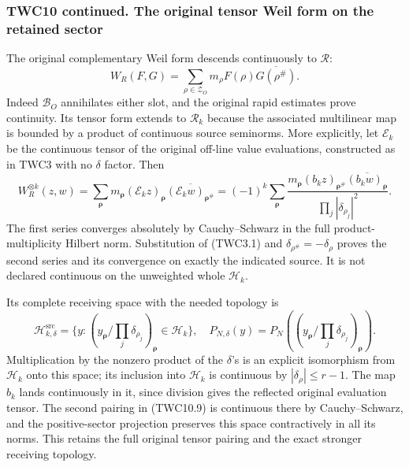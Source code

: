 \subsubsection{TWC10 continued. The original tensor Weil form on the
retained
sector}\label{twc10-continued.-the-original-tensor-weil-form-on-the-retained-sector}

The original complementary Weil form descends continuously to
\(\mathcal R\): \[
W_R(F,G)=\sum_{\rho\in\mathscr Z_O}m_\rho F(\rho)\overline{G(\rho^\#)}.
\tag{TWC10.8}
\] Indeed \(\mathcal B_O\) annihilates either slot, and the original
rapid estimates prove continuity. Its tensor form extends to
\(\mathscr R_k\) because the associated multilinear map is bounded by a
product of continuous source seminorms. More explicitly, let
\(\mathcal E_k\) be the continuous tensor of the original off-line value
evaluations, constructed as in TWC3 with no \(\delta\) factor. Then \[
W_R^{\otimes k}(z,w)=\sum_{\boldsymbol\rho}m_{\boldsymbol\rho}
 (\mathcal E_kz)_{\boldsymbol\rho}
 \overline{(\mathcal E_kw)_{\boldsymbol\rho^\#}}
=(-1)^k\sum_{\boldsymbol\rho}
\frac{m_{\boldsymbol\rho}(b_kz)_{\boldsymbol\rho^\#}
\overline{(b_kw)_{\boldsymbol\rho}}}{\prod_j|\delta_{\rho_j}|^2}.
\tag{TWC10.9}
\] The first series converges absolutely by Cauchy--Schwarz in the full
product-multiplicity Hilbert norm. Substitution of (TWC3.1) and
\(\delta_{\rho^\#}=-\delta_\rho\) proves the second series and its
convergence on exactly the indicated source. It is not declared
continuous on the unweighted whole \(\mathscr H_k\).

Its complete receiving space with the needed topology is \[
\mathscr H_{k,\delta}^{\mathrm{src}}=
\{y:(y_{\boldsymbol\rho}/\prod_j\delta_{\rho_j})_{\boldsymbol\rho}\in\mathscr H_k\},
\quad P_{N,\delta}(y)=P_N((y_{\boldsymbol\rho}/\prod_j\delta_{\rho_j})_{\boldsymbol\rho}).
\tag{TWC10.10}
\] Multiplication by the nonzero product of the \(\delta\)'s is an
explicit isomorphism from \(\mathscr H_k\) onto this space; its
inclusion into \(\mathscr H_k\) is continuous by
\(|\delta_\rho|\le r-1\). The map \(b_k\) lands continuously in it,
since division gives the reflected original evaluation tensor. The
second pairing in (TWC10.9) is continuous there by Cauchy--Schwarz, and
the positive-sector projection preserves this space contractively in all
its norms. This retains the full original tensor pairing and the exact
stronger receiving topology.

